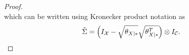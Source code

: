 \begin{proof}
\begin{equation*}
  \end{equation*}
  which can be written using Kronecker product notation as
  $$\tilde\Sigma = \Big(I_{\mathcal{X}} - \sqrt{\theta_{X|\ast}} \sqrt{\theta_{X|\ast}^T}\Big) \otimes I_{\mathcal{C}}.$$


\end{proof}
